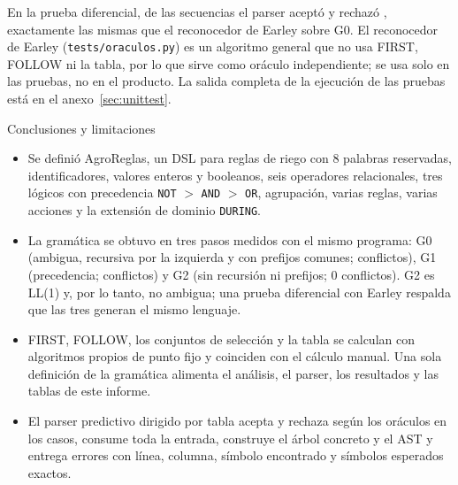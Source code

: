 \documentclass[11pt,letterpaper]{article}
\makeatletter
\renewcommand\section{\@startsection{section}{1}{\z@}{-3.2ex \@plus -1ex \@minus -.2ex}{1.6ex \@plus .2ex}%
  {\normalfont\Large\bfseries\color{acento}}}
\newcommand{\ruta}[1]{\nolinkurl{#1}}
\newcommand{\T}[1]{\texttt{#1}}
\makeatother
\begin{document}
En la prueba diferencial, de las \NumDiferenciales{} secuencias el parser aceptó \NumDiferencialesAceptadas{} y
rechazó \NumDiferencialesRechazadas{}, exactamente las mismas que el reconocedor de Earley sobre G0. El reconocedor de
Earley (\ruta{tests/oraculos.py}) es un algoritmo general que no usa FIRST, FOLLOW ni la tabla, por lo que sirve como
oráculo independiente; se usa solo en las pruebas, no en el producto. La salida completa de la ejecución de las pruebas
está en el anexo~\ref{sec:unittest}.

\section{Conclusiones y limitaciones}\label{sec:conclusiones}

\begin{itemize}
\item Se definió AgroReglas, un DSL para reglas de riego con 8 palabras reservadas, identificadores, valores enteros y
booleanos, seis operadores relacionales, tres lógicos con precedencia \T{NOT} $>$ \T{AND} $>$ \T{OR}, agrupación,
varias reglas, varias acciones y la extensión de dominio \T{DURING}.
\item La gramática se obtuvo en tres pasos medidos con el mismo programa: G0 (ambigua, recursiva por la izquierda y
con prefijos comunes; \NumConflictosGcero{} conflictos), G1 (precedencia; \NumConflictosGuno{} conflictos) y G2 (sin
recursión ni prefijos; 0 conflictos). G2 es LL(1) y, por lo tanto, no ambigua; una prueba diferencial con Earley
respalda que las tres generan el mismo lenguaje.
\item FIRST, FOLLOW, los conjuntos de selección y la tabla se calculan con algoritmos propios de punto fijo y
coinciden con el cálculo manual. Una sola definición de la gramática alimenta el análisis, el parser, los
resultados y las tablas de este informe.
\item El parser predictivo dirigido por tabla acepta y rechaza según los oráculos en los \NumCasos{} casos, consume
toda la entrada, construye el árbol concreto y el AST y entrega errores con línea, columna, símbolo encontrado y
símbolos esperados exactos.
\end{itemize}
\end{document}
